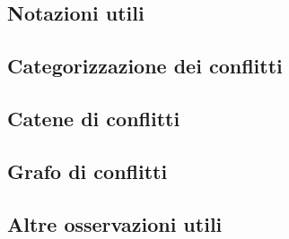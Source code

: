 \documentclass[../../relazione.tex]{subfiles}
\begin{document}
\subsection{Notazioni utili}


\subsection{Categorizzazione dei conflitti}



\subsection{Catene di conflitti}\label{def:catene_conflitti}


\subsection{Grafo di conflitti}


\subsection{Altre osservazioni utili}

\end{document}
